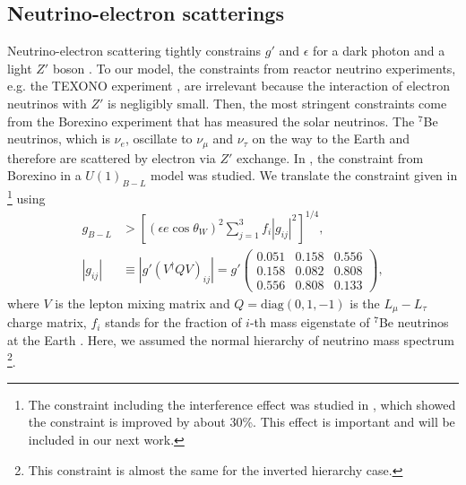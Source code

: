 \documentclass[preprint,amsmath,amssymb,superscriptaddress,nofootinbib]{revtex4}
\begin{document}
\subsection{Neutrino-electron scatterings}
Neutrino-electron scattering tightly constrains $g'$ and $\epsilon$ for a dark photon and a light $Z'$ 
boson \cite{Harnik:2012ni, Bilmis:2015lja}. 
To our model, the constraints from reactor neutrino experiments, e.g. the TEXONO 
experiment \cite{Deniz:2009mu, Li:2002pn, Wong:2006nx, Chen:2014dsa},  
are irrelevant because the interaction of electron neutrinos with $Z'$ is negligibly small. Then, 
the most stringent constraints come from the Borexino experiment \cite{Bellini:2011rx} that has 
measured the solar neutrinos.
The $^7$Be neutrinos, which is $\nu_e$, oscillate to $\nu_\mu$ and $\nu_\tau$ on the way to the 
Earth and therefore are scattered by electron via $Z'$ exchange. In \cite{Harnik:2012ni}, the constraint from 
Borexino in a $U(1)_{B-L}$ model was studied. We translate the constraint 
given in \cite{Harnik:2012ni}\footnote{The constraint including the interference effect was studied in \cite{Bilmis:2015lja}, 
which showed the constraint is improved by about $30$\%. This effect is important and will be included in our next work.}  
using 
\begin{align}
  g_{B-L} &> \left[(\epsilon e \cos\theta_W)^2 \sum_{j=1}^3f_i|g_{ij}|^2\right]^{1/4}, \\
%
 |g_{ij}| & \equiv |g' (V^\dagger Q V)_{ij}| = g'
  \begin{pmatrix}
    0.051 & 0.158 & 0.556\\
    0.158 & 0.082 & 0.808\\
    0.556 & 0.808 & 0.133
  \end{pmatrix}, 
\end{align}
where $V$ is the lepton mixing matrix \cite{Maki:1962mu, Pontecorvo:1967fh} 
and $Q = \mathrm{diag}(0,1,-1)$ is the $L_\mu - L_\tau$ charge matrix, $f_i$ stands 
for the fraction of $i$-th mass eigenstate of $^7$Be 
neutrinos at the Earth \cite{Nunokawa:2006ms}. Here, we assumed the normal hierarchy of neutrino 
mass spectrum \cite{Olive:2016xmw}\footnote{This constraint is almost the same for the inverted hierarchy case.}.


\end{document}
